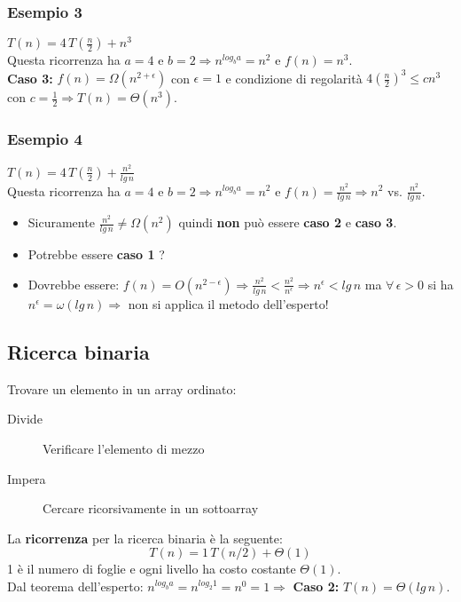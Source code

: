 \documentclass[10pt, a4paper]{report}
\begin{document}
\subsubsection{Esempio 3}
$T(n) = 4\,T(\frac{n}{2}) + n^3$\\
Questa ricorrenza ha $a = 4$ e $b = 2 \Rightarrow n^{log_{b}{a}} = n^2$ e $f(n) = n^3$.\\\textbf{Caso 3:} $f(n) = \Omega(n^{2 + \epsilon})$ con $\epsilon = 1$ e condizione di regolarità $4(\frac{n}{2})^3 \leq cn^3$ con $c = \frac{1}{2} \Rightarrow T(n) = \Theta(n^3)$.
\subsubsection{Esempio 4}
$T(n) = 4\,T(\frac{n}{2}) + \frac{n^2}{lg\,n}$\\
Questa ricorrenza ha $a = 4$ e $b = 2 \Rightarrow n^{log_{b}{a}} = n^2$ e $f(n) = \frac{n^2}{lg\,n} \Rightarrow n^2$ vs. $\frac{n^2}{lg\,n}$.
\begin{itemize}
\item Sicuramente $\frac{n^2}{lg\,n} \neq \Omega(n^2)$ quindi \textbf{non} può essere \textbf{caso 2} e \textbf{caso 3}.
\item Potrebbe essere \textbf{caso 1} ?
\item[]Dovrebbe essere: $f(n) = O(n^{2 - \epsilon}) \Rightarrow \frac{n^2}{lg\,n} < \frac{n^2}{n^\epsilon} \Rightarrow n^\epsilon < lg\,n$ ma $\forall\, \epsilon > 0$ si ha $n^\epsilon = \omega(lg\,n) \Rightarrow$ non si applica il metodo dell'esperto!
\end{itemize}
\subsection{Ricerca binaria}
Trovare un elemento in un array ordinato:
\begin{description}
\item[Divide]Verificare l'elemento di mezzo
\item[Impera]Cercare ricorsivamente in un sottoarray
\end{description}
La \textbf{ricorrenza} per la ricerca binaria è la seguente:
\begin{equation*}
T(n) = 1\,T(n/2) + \Theta(1)
\end{equation*}
1 è il numero di foglie e ogni livello ha costo costante $\Theta(1)$.\\
Dal teorema dell'esperto: $n^{log_{b}{a}} = n^{log_{2}{1}} = n^0 = 1 \Rightarrow$ \textbf{Caso 2:} $T(n) = \Theta(lg\,n)$.
\end{document}
